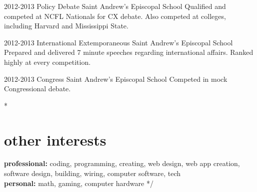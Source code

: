 \documentclass[]{friggeri-cv} %
\begin{document}
\begin{entrylist}


\entry
{2012-2013}
{Policy Debate}
{Saint Andrew's Episcopal School}
{Qualified and competed at NCFL Nationals for CX debate. Also competed at colleges, including Harvard and Mississippi State.}


\entry
{2012-2013}
{International Extemporaneous}
{Saint Andrew's Episcopal School}
{Prepared and delivered 7 minute speeches regarding international affairs. Ranked highly at every competition.}


\entry
{2012-2013}
{Congress}
{Saint Andrew's Episcopal School}
{Competed in mock Congressional debate.}


\end{entrylist}

\/*
\section{other interests}

\textbf{professional:} coding, programming, creating, web design, web app creation, software design, building, wiring, computer software, tech 
\\ 
\textbf{personal:} math, gaming, computer hardware  
*/
\end{document}
